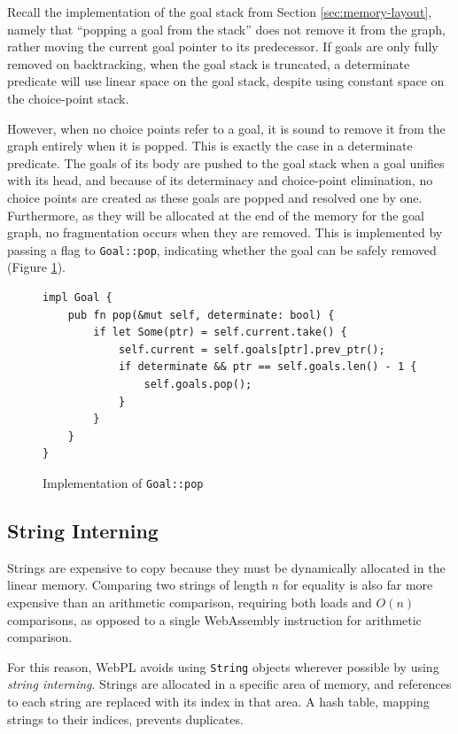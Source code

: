 Recall the implementation of the goal stack from Section \ref{sec:memory-layout}, namely that ``popping a goal from the stack'' does not remove it from the graph, rather moving the current goal pointer to its predecessor. If goals are only fully removed on backtracking, when the goal stack is truncated, a determinate predicate will use linear space on the goal stack, despite using constant space on the choice-point stack.

However, when no choice points refer to a goal, it is sound to remove it from the graph entirely when it is popped. This is exactly the case in a determinate predicate. The goals of its body are pushed to the goal stack when a goal unifies with its head, and because of its determinacy and choice-point elimination, no choice points are created as these goals are popped and resolved one by one. Furthermore, as they will be allocated at the end of the memory for the goal graph, no fragmentation occurs when they are removed. This is implemented by passing a flag to \texttt{Goal::pop}, indicating whether the goal can be safely removed (Figure \ref{fig:goal-pop}).

\begin{figure}[H]
\centering
\begin{verbatim}
impl Goal {
    pub fn pop(&mut self, determinate: bool) {
        if let Some(ptr) = self.current.take() {
            self.current = self.goals[ptr].prev_ptr();
            if determinate && ptr == self.goals.len() - 1 {
                self.goals.pop();
            }
        }
    }
}
\end{verbatim}
\caption{Implementation of \texttt{Goal::pop}}
\label{fig:goal-pop}
\end{figure}

\subsection{String Interning}

Strings are expensive to copy because they must be dynamically allocated in the linear memory. Comparing two strings of length $n$ for equality is also far more expensive than an arithmetic comparison, requiring both loads and $O(n)$ comparisons, as opposed to a single WebAssembly instruction for arithmetic comparison.

For this reason, WebPL avoids using \texttt{String} objects wherever possible by using \emph{string interning}. Strings are allocated in a specific area of memory, and references to each string are replaced with its index in that area. A hash table, mapping strings to their indices, prevents duplicates.

